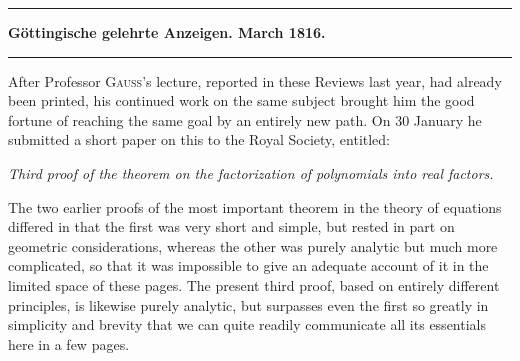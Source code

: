 \clearpage{}
\begin{center}
\rule{0.45\linewidth}{0.4pt}\par
\textbf{Göttingische gelehrte Anzeigen. March 1816.}\par
\rule{0.45\linewidth}{0.4pt}
\end{center}

After Professor \textsc{Gauss}'s lecture, reported in these Reviews last year, had already been printed, his continued work on the same subject brought him the good fortune of reaching the same goal by an entirely new path. On 30 January he submitted a short paper on this to the Royal Society, entitled:

\begin{center}
\emph{Third proof of the theorem on the factorization of polynomials into real factors.}
\end{center}

The two earlier proofs of the most important theorem in the theory of equations differed in that the first was very short and simple, but rested in part on geometric considerations, whereas the other was purely analytic but much more complicated, so that it was impossible to give an adequate account of it in the limited space of these pages. The present third proof, based on entirely different principles, is likewise purely analytic, but surpasses even the first so greatly in simplicity and brevity that we can quite readily communicate all its essentials here in a few pages.

